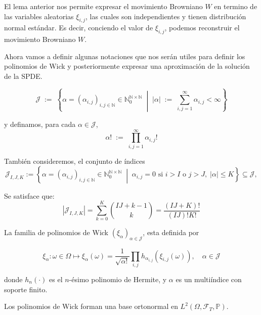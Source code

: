 \begin{obs}[]
  El lema anterior nos permite expresar el movimiento Browniano $W$ en termino de las variables aleatorias $\xi_{i,j}$, las cuales son independientes y tienen distribución normal estándar. Es decir, conciendo el valor de $\xi_{i,j}$, podemos reconstruir el movimiento Browniano $W$.
\end{obs}

Ahora vamos a definir algunas notaciones que nos serán utiles para definir los polinomios de Wick y posteriormente expresar una aproximación de la solución de la SPDE.

\begin{nota}[]
  \[
    \mathcal{J} \;:=\; \left\{\alpha = (\alpha_{i,j})_{i,j \in \mathbb{N}} \in \mathbb{N}_{0}^{\mathbb{N} \times \mathbb{N}} \;\middle|\; |\alpha| \;:=\; \sum_{i,j=1}^{\infty}\alpha_{i,j} < \infty \right\}
  \]

  y definamos, para cada $\alpha \in \mathcal{J}$,
  \[
    \alpha! \;:=\; \prod_{i,j=1}^{\infty} \alpha_{i,j}!
  \]

  También consideremos, el conjunto de índices
  \[
    \mathcal{J}_{I, J, K} := \left\{ \alpha = (\alpha_{i,j})_{i,j \in \mathbb{N}} \in \mathbb{N}_0^{\mathbb{N} \times \mathbb{N}} \;\middle|\; \alpha_{i,j} = 0 \text{ si } i > I \text{ o } j > J,\; |\alpha| \leqslant K \right\} \subseteq \mathcal{J},
  \]
\end{nota}

\begin{obs}[]
  Se satisface que:
  \[
    \left|\mathcal{J}_{I, J, K}\right| = \sum_{k=0}^{K} \binom{IJ + k - 1}{k} = \frac{(IJ + K)!}{(IJ)!K!}
  \]
\end{obs}

\begin{defn}
  La familia de polinomios de Wick $(\xi_\alpha)_{\alpha \in \mathcal{J}}$, esta definida por

  \begin{equation}
    \xi_\alpha : \omega \in \Omega \mapsto \xi_{
    \alpha}(\omega) = \frac{1}{\sqrt{\alpha!}} \prod_{i,j} h_{\alpha_{i,j}}(\xi_{i,j} (\omega)), \quad \alpha \in \mathcal{J}
  \end{equation}

  donde $h_n(\cdot)$ es el $n$-ésimo polinomio de Hermite, y $\alpha$ es un multiíndice con soporte finito.
\end{defn}

\begin{prop}[]
  Los polinomios de Wick forman una base ortonormal en $L^2(\Omega, \mathcal{F}_T, \mathbb{P})$.
\end{prop}


